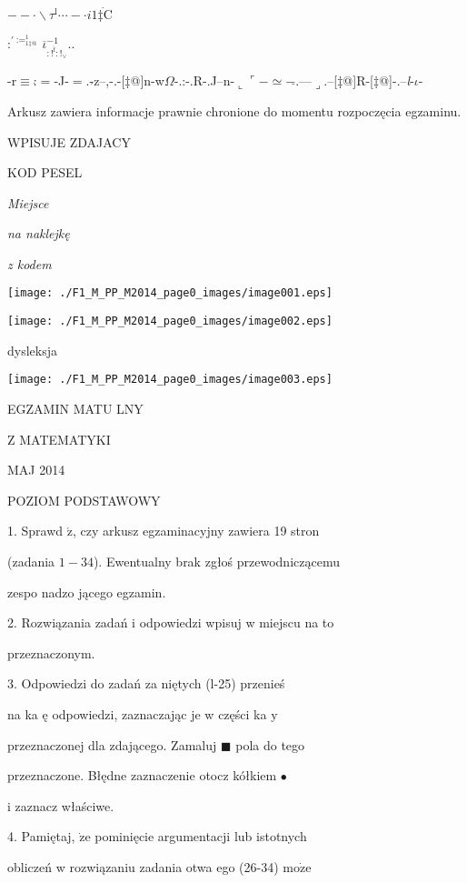 \documentclass[a4paper,12pt]{article}
\begin{document}
$--\cdot\backslash \tau^{\mathrm{l}}\cdots-\cdot i1\dot{\text{‡C}}$

$:_{}^{\prime:=_{1\text{‡@}}^{1}}\overline{\iota}_{:\dot{!^{\mathrm{f}}:}!_{\vee}}^{-1}..$

-r$\equiv$:$\grave{}=$-J-$=$.-$\acute{}$z--,-.-[‡@]n-w$\Omega$-.:-.R-.J--n-$\llcorner\ulcorner-\simeq-\breve{}$.---$\lrcorner$.--[‡@]R-[‡@]-.--{\it l}-$\iota$-

Arkusz zawiera informacje prawnie chronione do momentu rozpoczęcia egzaminu.

WPISUJE ZDAJACY

KOD PESEL

{\it Miejsce}

{\it na naklejkę}

{\it z kodem}
\begin{center}
\texttt{[image: ./F1\_M\_PP\_M2014\_page0\_images/image001.eps]}

\texttt{[image: ./F1\_M\_PP\_M2014\_page0\_images/image002.eps]}
\end{center}
\fbox{} dysleksja
\begin{center}
\texttt{[image: ./F1\_M\_PP\_M2014\_page0\_images/image003.eps]}
\end{center}
EGZAMIN MATU LNY

Z MATEMATYKI

MAJ 2014

POZIOM PODSTAWOWY

1. Sprawd $\acute{\mathrm{z}}$, czy arkusz egzaminacyjny zawiera 19 stron

(zadania $1-34$). Ewentualny brak zgłoś przewodniczącemu

zespo nadzo jącego egzamin.

2. Rozwiązania zadań i odpowiedzi wpisuj w miejscu na to

przeznaczonym.

3. Odpowiedzi do zadań za niętych (l-25) przenieś

na ka ę odpowiedzi, zaznaczając je w części ka $\mathrm{y}$

przeznaczonej dla zdającego. Zamaluj $\blacksquare$ pola do tego

przeznaczone. Błędne zaznaczenie otocz kółkiem \fcircle$\bullet$

i zaznacz właściwe.

4. Pamiętaj, $\dot{\mathrm{z}}\mathrm{e}$ pominięcie argumentacji lub istotnych

obliczeń w rozwiązaniu zadania otwa ego (26-34) $\mathrm{m}\mathrm{o}\dot{\mathrm{z}}\mathrm{e}$
\end{document}

